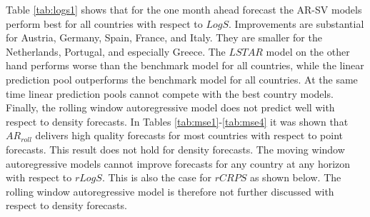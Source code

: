 \documentclass[12pt,letterpaper,fleqn]{article}           %
\begin{document}
Table \ref{tab:logs1} shows that for the one month ahead forecast the AR-SV models perform best for all countries with respect to $LogS$. Improvements are substantial for Austria, Germany, Spain, France, and Italy. They are smaller for the Netherlands, Portugal, and especially Greece. The $LSTAR$ model on the other hand performs worse than the benchmark model for all countries, while the linear prediction pool outperforms the benchmark model for all countries. At the same time linear prediction pools cannot compete with the best country models. Finally, the rolling window autoregressive model does not predict well with respect to density forecasts. In Tables \ref{tab:mse1}-\ref{tab:mse4} it was shown that $AR_{roll}$ delivers high quality forecasts for most countries with respect to point forecasts. This result does not hold for density forecasts. The moving window autoregressive models cannot improve forecasts for any country at any horizon with respect to $rLogS$. This is also the case for $rCRPS$ as shown below. The rolling window autoregressive model is therefore not further discussed with respect to density forecasts.
\end{document}
